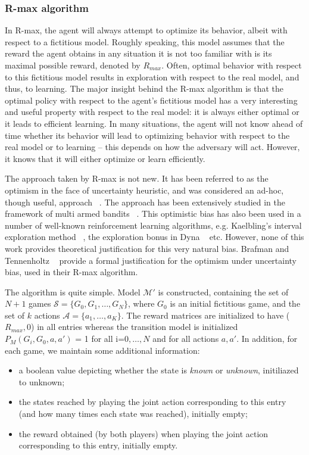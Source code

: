 \subsubsection{R-max algorithm}
In R-max, the agent will always attempt to optimize its behavior, albeit with respect to a fictitious model. Roughly speaking, this model assumes that the reward the agent obtains in any situation it is not too familiar with is its maximal possible reward, denoted by $R_{max}$. Often, optimal behavior with respect to this fictitious
model results in exploration with respect to the real model, and thus, to learning. The
major insight behind the R-max algorithm is that the optimal policy with respect to the agent’s fictitious model has a very interesting and useful property with respect to the real model: it is always either optimal or it leads to efficient learning. In many situations, the agent will not know ahead of time whether its behavior will lead to optimizing behavior with respect to the real model or to learning – this depends on how the adversary will act. However, it knows that it will either optimize or learn efficiently.\par
The approach taken by R-max is not new. It has been referred to as the optimism in the face of uncertainty heuristic, and was considered an ad-hoc, though useful, approach ~\cite{KLMSurvey,Sutton:1998:IRL:551283}. The approach has been extensively studied in the framework of multi armed bandits ~\cite{journals/corr/abs-1204-5721}. This optimistic bias has also been used in a number of well-known reinforcement learning algorithms, e.g. Kaelbling’s interval exploration method ~\cite{kaelbling1993learning}, the exploration bonus in Dyna ~\cite{DBLP:journals/sigart/Sutton91} etc. However, none of this work provides theoretical justification for this very natural bias. Brafman and Tennenholtz ~\cite{Brafman:2003:RGP:944919.944928} provide a formal justification for the optimism under uncertainty bias, used in their R-max algorithm.\par
The algorithm is quite simple. Model $\mathcal{M}'$ is constructed, containing the set of $N+1$ games $\mathcal{S}= \lbrace G_0,G_1,\ldots,G_N \rbrace$, where $G_0$ is an initial fictitious game, and the set of $k$ actions $\mathcal{A}= \lbrace a_1,\ldots,a_K \rbrace$. The reward matrices are initialized to have ($R_{max},0$) in all entries whereas the transition model is initialized $P_M(G_i,G_0,a,a′)$ = 1 for all i=$0,\ldots,N$ and for all actions $a,a′$. In addition, for each game, we maintain some additional information:
\begin{itemize}
\item a boolean value depicting whether the state is \emph{known} or \emph{unknown}, initiliazed to unknown;
\item the states reached by playing the joint action corresponding to this entry (and how many times each state was reached), initially empty;
\item the reward obtained (by both players) when playing the joint action
corresponding to this entry, initially empty.
\end{itemize}
